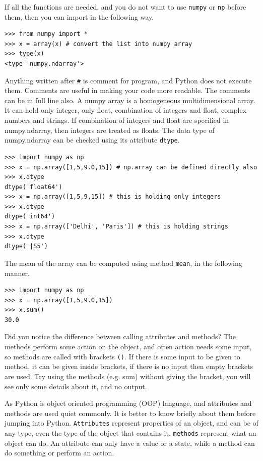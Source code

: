 \documentclass[10pt]{book}
\begin{document}
{If all the functions are needed, and you do not want to use \verb"numpy" or \verb"np" before them, then you can import in the following way.
\beforeverb \begin{verbatim}
>>> from numpy import *
>>> x = array(x) # convert the list into numpy array
>>> type(x) 
<type 'numpy.ndarray'>
\end{verbatim} \afterverb

Anything written after \verb"#" is comment for program, and Python does not execute them. Comments are useful in making your code more readable. The comments can be in full line also. A numpy array is a homogeneous multidimensional array. It can hold only integer, only float, combination of integers and float, complex numbers and strings. If combination of integers and float are specified in numpy.ndarray, then integers are treated as floats. The data type of numpy.ndarray can be checked using its attribute \verb"dtype". 
\beforeverb \begin{verbatim}
>>> import numpy as np
>>> x = np.array([1,5,9.0,15]) # np.array can be defined directly also
>>> x.dtype
dtype('float64')
>>> x = np.array([1,5,9,15]) # this is holding only integers
>>> x.dtype
dtype('int64')
>>> x = np.array(['Delhi', 'Paris']) # this is holding strings
>>> x.dtype
dtype('|S5')
\end{verbatim} \afterverb
The mean of the array can be computed using method \verb"mean", in the following manner.
\beforeverb
\begin{verbatim}
>>> import numpy as np
>>> x = np.array([1,5,9.0,15]) 
>>> x.sum()
30.0
\end{verbatim}
\afterverb
Did you notice the difference between calling attributes and methods? The methods perform some action on the object, and often action needs some input, so methods are called with brackets \verb"()". If there is some input to be given to method, it can be given inside brackets, if there is no input then empty brackets are used. Try using the methods (e.g. sum) without giving the bracket, you will see only some details about it, and no output. 

As Python is object oriented programming (OOP) language, and attributes and methods are used quiet commonly. It is better to know briefly about them before jumping into Python. \verb"Attributes" represent properties of an object, and can be of any type, even the type of the object that contains it. \verb"methods" represent what an object can do. An attribute can only have a value or a state, while a method can do something or perform an action. 

}
\end{document}
